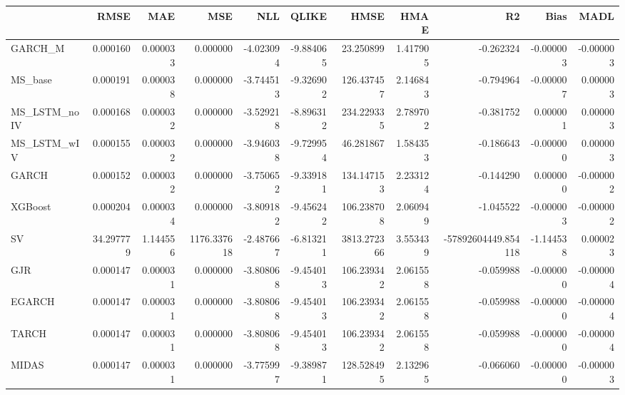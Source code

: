 \begin{tabular}{lrrrrrrrrrr}
\toprule
 & RMSE & MAE & MSE & NLL & QLIKE & HMSE & HMAE & R2 & Bias & MADL \\
\midrule
GARCH_M & 0.000160 & 0.000033 & 0.000000 & -4.023094 & -9.884065 & 23.250899 & 1.417905 & -0.262324 & -0.000003 & -0.000003 \\
MS_base & 0.000191 & 0.000038 & 0.000000 & -3.744513 & -9.326902 & 126.437457 & 2.146843 & -0.794964 & -0.000007 & 0.000003 \\
MS_LSTM_noIV & 0.000168 & 0.000032 & 0.000000 & -3.529218 & -8.896312 & 234.229335 & 2.789702 & -0.381752 & 0.000001 & 0.000003 \\
MS_LSTM_wIV & 0.000155 & 0.000032 & 0.000000 & -3.946038 & -9.729954 & 46.281867 & 1.584353 & -0.186643 & -0.000000 & 0.000003 \\
GARCH & 0.000152 & 0.000032 & 0.000000 & -3.750652 & -9.339181 & 134.147153 & 2.233124 & -0.144290 & 0.000000 & -0.000002 \\
XGBoost & 0.000204 & 0.000034 & 0.000000 & -3.809182 & -9.456242 & 106.238708 & 2.060949 & -1.045522 & -0.000003 & -0.000002 \\
SV & 34.297779 & 1.144556 & 1176.337618 & -2.487667 & -6.813211 & 3813.272366 & 3.553439 & -57892604449.854118 & -1.144538 & 0.000023 \\
GJR & 0.000147 & 0.000031 & 0.000000 & -3.808068 & -9.454013 & 106.239342 & 2.061558 & -0.059988 & -0.000000 & -0.000004 \\
EGARCH & 0.000147 & 0.000031 & 0.000000 & -3.808068 & -9.454013 & 106.239342 & 2.061558 & -0.059988 & -0.000000 & -0.000004 \\
TARCH & 0.000147 & 0.000031 & 0.000000 & -3.808068 & -9.454013 & 106.239342 & 2.061558 & -0.059988 & -0.000000 & -0.000004 \\
MIDAS & 0.000147 & 0.000031 & 0.000000 & -3.775997 & -9.389871 & 128.528495 & 2.132965 & -0.066060 & -0.000000 & -0.000003 \\
\bottomrule
\end{tabular}
